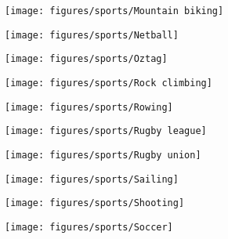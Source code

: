 \documentclass[11pt]{article}
\begin{document}
     \begin{figure}[htb!]
         \centering

         \begin{subfigure}{.5\textwidth}
             \centering
             \texttt{[image: figures/sports/Mountain biking]}
         \end{subfigure}%
         \hfill
         \begin{subfigure}{.5\textwidth}
             \centering
             \texttt{[image: figures/sports/Netball]}
         \end{subfigure}%
         \hfill
         \begin{subfigure}{.5\textwidth}
             \centering
             \texttt{[image: figures/sports/Oztag]}
         \end{subfigure}%
         \hfill
         \begin{subfigure}{.5\textwidth}
             \centering
             \texttt{[image: figures/sports/Rock climbing]}
         \end{subfigure}%
         \hfill
         \begin{subfigure}{.5\textwidth}
             \centering
             \texttt{[image: figures/sports/Rowing]}
         \end{subfigure}%
         \hfill
         \begin{subfigure}{.5\textwidth}
             \centering
             \texttt{[image: figures/sports/Rugby league]}
         \end{subfigure}%
         \hfill
         \begin{subfigure}{.5\textwidth}
             \centering
             \texttt{[image: figures/sports/Rugby union]}
         \end{subfigure}%
         \hfill
         \begin{subfigure}{.5\textwidth}
             \centering
             \texttt{[image: figures/sports/Sailing]}
         \end{subfigure}%
         \hfill
         \begin{subfigure}{.5\textwidth}
             \centering
             \texttt{[image: figures/sports/Shooting]}
         \end{subfigure}%
         \hfill
         \begin{subfigure}{.5\textwidth}
             \centering
             \texttt{[image: figures/sports/Soccer]}
         \end{subfigure}%
     \end{figure}
\end{document}
